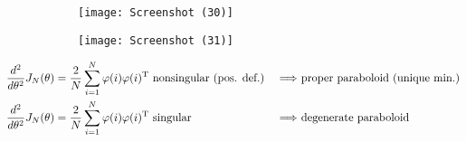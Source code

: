 \begin{figure}
\centering
\begin{subfigure}{.5\textwidth}
  \centering
  \texttt{[image: Screenshot (30)]}
  \label{fig:test1}
\end{subfigure}%
\begin{subfigure}{.5\textwidth}
  \centering
  \texttt{[image: Screenshot (31)]}
  \label{fig:test2}
\end{subfigure}
\end{figure}


\begin{equation*}
\begin{aligned}
\frac{d^{2}}{d\theta ^{2}} J_{N}( \theta ) & =\frac{2}{N}\sum _{i=1}^{N} \varphi ( i) \varphi ( i)\transpose \ \text{nonsingular} \ \text{(pos. def.)} & \Longrightarrow \ & \text{proper paraboloid (unique min.)}\\
\frac{d^{2}}{d\theta ^{2}} J_{N}( \theta ) & =\frac{2}{N}\sum _{i=1}^{N} \varphi ( i) \varphi ( i)\transpose\text{ singular} & \ \Longrightarrow \ & \text{degenerate paraboloid}
\end{aligned}
\end{equation*}

